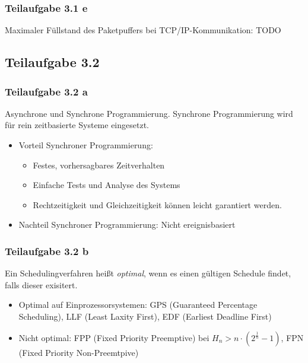 \documentclass[a4paper]{scrartcl}
\begin{document}
  \subsubsection*{Teilaufgabe 3.1 e}
  Maximaler Füllstand des Paketpuffers bei TCP/IP-Kommunikation: TODO

  \subsection*{Teilaufgabe 3.2}
  \subsubsection*{Teilaufgabe 3.2 a}
  Asynchrone und Synchrone Programmierung.
  Synchrone Programmierung wird für rein zeitbasierte Systeme eingesetzt.

  \begin{itemize}
      \item Vorteil Synchroner Programmierung:
      \begin{itemize}
          \item Festes, vorhersagbares Zeitverhalten
          \item Einfache Tests und Analyse des Systems
          \item Rechtzeitigkeit und Gleichzeitigkeit können leicht garantiert
                werden.
      \end{itemize}
      \item Nachteil Synchroner Programmierung: Nicht ereignisbasiert
  \end{itemize}


  \subsubsection*{Teilaufgabe 3.2 b}
  Ein Schedulingverfahren heißt \textit{optimal}, wenn es einen gültigen
  Schedule findet, falls dieser exisitert.

  \begin{itemize}
      \item Optimal auf Einprozessorsystemen: GPS (Guaranteed Percentage Scheduling),
            LLF (Least Laxity First),
            EDF (Earliest Deadline First)
      \item Nicht optimal: FPP (Fixed Priority Preemptive) bei $H_n > n \cdot (2^{\frac{1}{n}} - 1)$,
            FPN (Fixed Priority Non-Preemtpive)
  \end{itemize}
\end{document}
